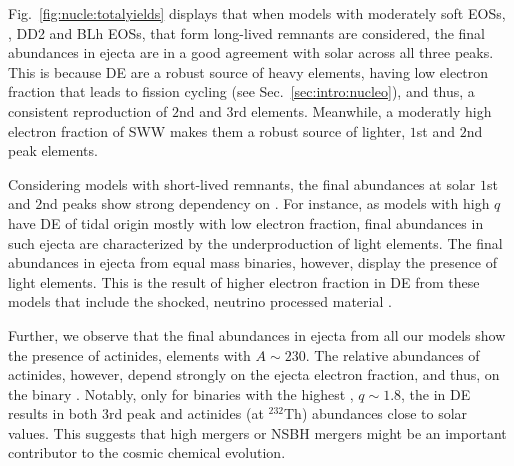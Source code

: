 Fig.~\ref{fig:nucle:totalyields} displays that when models with moderately 
soft \acp{EOS}, \eg, DD2 and BLh \acp{EOS}, that form long-lived 
remnants are considered, 
the final \rproc{} abundances in ejecta are in a good agreement 
with solar across all three \rproc{} peaks. 
This is because \ac{DE} are a robust source of heavy elements, having low 
electron fraction that leads to fission cycling (see Sec.~\ref{sec:intro:nucleo}),
and thus, a consistent reproduction of $2$nd and $3$rd \rproc{} elements. 
Meanwhile, a moderatly high electron fraction of \ac{SWW} makes them 
a robust source of lighter, $1$st and $2$nd peak elements. 

Considering models with short-lived remnants, the final \rproc{} abundances 
at solar $1$st and $2$nd \rproc{} peaks show 
strong dependency on \mr{}. 
For instance, as models with high $q$ have \ac{DE} of tidal origin mostly with low 
electron fraction, final \rproc{} abundances in such ejecta are characterized
by the underproduction of light elements. 
%
The final abundances in ejecta from equal mass binaries, 
however, display the presence of light \rproc{} elements. 
This is the result of higher electron fraction in \ac{DE} from these models 
that include the shocked, neutrino processed material 
\citep{Wanajo:2014wha,Radice:2018pdn}. 

Further, we observe that the final abundances in ejecta from all our models show 
the presence of actinides, elements with $A \sim 230$. 
The relative abundances of actinides, however, depend strongly on the ejecta 
electron fraction, and thus, on the binary \mr{}.
Notably, only for binaries with the highest \mr{}, $q\sim1.8$, the 
\rproc{} in \ac{DE} results in both $3$rd peak and actinides (at $^{232}$Th) abundances 
close to solar values. 
This suggests that  high \mr{} mergers or \ac{NSBH} mergers might be an 
important contributor to the cosmic chemical evolution.




